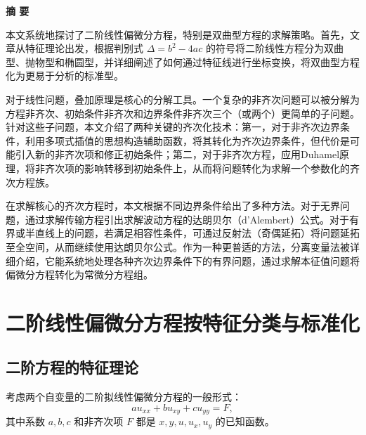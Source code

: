 \documentclass[a4paper, 12pt, oneside]{article} %
\numberwithin{subsection}{section}
\numberwithin{subsubsection}{subsection}
\theoremstyle{plain}
\theoremstyle{definition}
\theoremstyle{remark}
\begin{document}
		
		
		\clearpage
		
		\newpage %
		\centerline{\textbf{摘 \quad \quad \quad \quad 要}}
		本文系统地探讨了二阶线性偏微分方程，特别是双曲型方程的求解策略。首先，文章从特征理论出发，根据判别式 \(\Delta = b^2 - 4ac\) 的符号将二阶线性方程分为双曲型、抛物型和椭圆型，并详细阐述了如何通过特征线进行坐标变换，将双曲型方程化为更易于分析的标准型。
		
		对于线性问题，叠加原理是核心的分解工具。一个复杂的非齐次问题可以被分解为方程非齐次、初始条件非齐次和边界条件非齐次三个（或两个）更简单的子问题。针对这些子问题，本文介绍了两种关键的齐次化技术：第一，对于非齐次边界条件，利用多项式插值的思想构造辅助函数，将其转化为齐次边界条件，但代价是可能引入新的非齐次项和修正初始条件；第二，对于非齐次方程，应用Duhamel原理，将非齐次项的影响转移到初始条件上，从而将问题转化为求解一个参数化的齐次方程族。
		
		在求解核心的齐次方程时，本文根据不同边界条件给出了多种方法。对于无界问题，通过求解传输方程引出求解波动方程的达朗贝尔（d'Alembert）公式。对于有界或半直线上的问题，若满足相容性条件，可通过反射法（奇偶延拓）将问题延拓至全空间，从而继续使用达朗贝尔公式。作为一种更普适的方法，分离变量法被详细介绍，它能系统地处理各种齐次边界条件下的有界问题，通过求解本征值问题将偏微分方程转化为常微分方程组。
		
		
		
		
		\newpage
		
		\tableofcontents  %
		
		
		
		\newpage
		\songti %
		
		\section{二阶线性偏微分方程按特征分类与标准化}
		\subsection{二阶方程的特征理论}
		考虑两个自变量的二阶拟线性偏微分方程的一般形式：
		\begin{equation}\label{eq:quasi_linear_2nd_order}
			a u_{xx} + b u_{xy} + c u_{yy} = F,
		\end{equation}
		其中系数 \(a, b, c\) 和非齐次项 \(F\) 都是 \(x, y, u, u_x, u_y\) 的已知函数。
		
\end{document}
